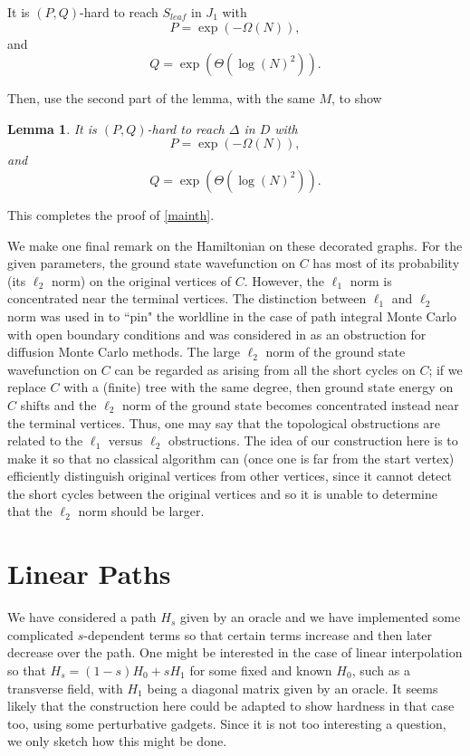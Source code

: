 \documentclass[letterpaper,onecolumn]{quantumarticle}
\newtheorem{lemma}{Lemma}
\newcommand{\be}{\begin{equation}}
\newcommand{\ee}{\end{equation}}
\begin{document}
It is $(P,Q)$-hard to reach $S_{leaf}$ in $J_1$ with
\be
P=\exp(-\Omega(N)),
\ee
and
\be
Q=\exp(\Theta(\log(N)^2)).
\ee

Then, use the second part of the lemma, with the same $M$, to show
\begin{lemma}
\label{hardnesslemma}
It is $(P,Q)$-hard to reach $\Delta$ in $D$ with
\be
P=\exp(-\Omega(N)),
\ee
and
\be
Q=\exp(\Theta(\log(N)^2)).
\ee
\end{lemma}

This completes the proof of \cref{mainth}.

We make one final remark on the Hamiltonian on these decorated graphs.  For the given parameters, the ground state wavefunction on $C$ has most of its probability (its $\ell_2$ norm) on the original vertices of $C$.  However, the $\ell_1$ norm is concentrated near the terminal vertices.  The distinction between $\ell_1$ and $\ell_2$ norm was used in \cite{obs} to ``pin" the worldline in the case of path integral Monte Carlo with open boundary conditions and was considered in \cite{Jarret_2016} as an obstruction for diffusion Monte Carlo methods.   
The large $\ell_2$ norm of the ground state wavefunction on $C$ can be regarded as arising from all the short cycles on $C$; if we replace $C$ with a (finite) tree with the same degree, then ground state energy on $C$ shifts and the $\ell_2$ norm of the ground state becomes concentrated instead near the terminal vertices.  Thus, one may say that the topological obstructions are related to the $\ell_1$ versus $\ell_2$ obstructions.  The idea of our construction here is to make it so that no classical algorithm can (once one is far from the start vertex) efficiently distinguish original vertices from other vertices, since it cannot detect the short cycles between the original vertices and so it is unable to determine that the $\ell_2$ norm should be larger.

\section{Linear Paths}
\label{linear}
We have considered a path $H_s$ given by an oracle and we have implemented some complicated $s$-dependent terms so that certain terms increase and then later decrease over the path.  One might be interested in the case of linear interpolation so that $H_s=(1-s) H_0+sH_1$ for some fixed and known $H_0$, such as a transverse field, with $H_1$ being a diagonal matrix given by an oracle.  It seems likely that the construction here could be adapted to show hardness in that case too, using some perturbative gadgets.  Since it is not too interesting a question, we only sketch how this might be done.
\end{document}
